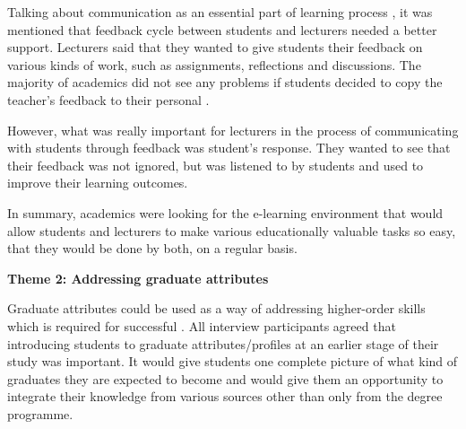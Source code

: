 Talking about communication as an essential part of learning process
\citep{Schaffert2008}, it was mentioned that feedback cycle between students
and lecturers needed a better support. Lecturers said that they wanted to give
students their feedback on various kinds of work, such as assignments,
reflections and discussions. The majority of academics did not see any problems
if students decided to copy the teacher's feedback to their personal \ep.


However, what was really important for lecturers in the process of communicating
with students through feedback was student's response. They wanted to see that
their feedback was not ignored, but was listened to by students and used to
improve their learning outcomes.


In summary, academics were looking for the e-learning environment that would
allow students and lecturers to make various educationally valuable tasks so easy,
that they would be done by both, on a regular basis.

\textbf{Theme 2: Addressing graduate attributes}

Graduate attributes could be used as a way of addressing higher-order skills
which is required for successful \LLLs \citep{Hart1999}. All interview
participants agreed that introducing students to graduate attributes/profiles at
an earlier stage of their study was important. It would give students one
complete picture of what kind of graduates they are expected to become and would
give them an opportunity to integrate their knowledge from various sources other
than only from the degree programme.


